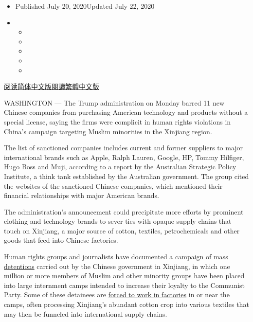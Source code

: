 \begin{itemize}
\item
  Published July 20, 2020Updated July 22, 2020
\item
  \begin{itemize}
  \item
  \item
  \item
  \item
  \item
  \end{itemize}
\end{itemize}

\href{https://cn.nytimes.com/business/20200721/china-sanctions-uighurs-labor/}{阅读简体中文版}\href{https://cn.nytimes.com/business/20200721/china-sanctions-uighurs-labor/zh-}{閱讀繁體中文版}

WASHINGTON --- The Trump administration on Monday barred 11 new Chinese
companies from purchasing American technology and products without a
special license, saying the firms were complicit in human rights
violations in China's campaign targeting Muslim minorities in the
Xinjiang region.

The list of sanctioned companies includes current and former suppliers
to major international brands such as Apple, Ralph Lauren, Google, HP,
Tommy Hilfiger, Hugo Boss and Muji, according to
\href{https://www.aspi.org.au/report/uyghurs-sale}{a report} by the
Australian Strategic Policy Institute, a think tank established by the
Australian government. The group cited the websites of the sanctioned
Chinese companies, which mentioned their financial relationships with
major American brands.

The administration's announcement could precipitate more efforts by
prominent clothing and technology brands to sever ties with opaque
supply chains that touch on Xinjiang, a major source of cotton,
textiles, petrochemicals and other goods that feed into Chinese
factories.

Human rights groups and journalists have documented a
\href{https://www.nytimes.com/interactive/2019/11/16/world/asia/china-xinjiang-documents.html}{campaign
of mass detentions} carried out by the Chinese government in Xinjiang,
in which one million or more members of Muslim and other minority groups
have been placed into large internment camps intended to increase their
loyalty to the Communist Party. Some of these detainees are
\href{https://www.nytimes.com/2018/12/16/world/asia/xinjiang-china-forced-labor-camps-uighurs.html}{forced
to work in factories} in or near the camps, often processing Xinjiang's
abundant cotton crop into various textiles that may then be funneled
into international supply chains.

